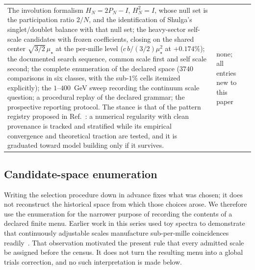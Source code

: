 \documentclass[aps,twocolumn,superscriptaddress,nofootinbib,floatfix]{revtex4-2}
\newcommand{\mstar}{\mu_\star}
\begin{document}
\begin{table}[t]
\begin{ruledtabular}
\begin{tabular}{p{}p{}p{}}
The involution formalism $H_N=2P_N-I$, $H_N^2=I$, whose null set is the participation ratio $2/N$, and the identification of Shulga's singlet/doublet balance with that null set; the heavy-sector self-scale candidates with frozen coefficients, closing on the shared center $\sqrt{3/2}\,\mstar$ at the per-mille level ($c\,b/(3/2)\mstar^2$ at $+0.174\%$); the documented search sequence, common scale first and self scale second; the complete enumeration of the declared space ($3740$ comparisons in six classes, with the sub-$1\%$ cells itemized explicitly); the $1$--$400$~GeV sweep recording the continuum scale question; a procedural replay of the declared grammar; the prospective reporting protocol. The stance is that of the pattern registry proposed in Ref.~\cite{BrilliantPattern}: a numerical regularity with clean provenance is tracked and stratified while its empirical convergence and theoretical traction are tested, and it is graduated toward model building only if it survives. &
none; all entries new to this paper \\
\end{tabular}
\end{ruledtabular}
\end{table}

\subsection{Candidate-space enumeration}
\label{sec:enum}

Writing the selection procedure down in advance fixes what was chosen; it does not reconstruct the historical space from which those choices arose. We therefore use the enumeration for the narrower purpose of recording the contents of a declared finite menu. Earlier work in this series used toy spectra to demonstrate that continuously adjustable scales manufacture sub-per-mille coincidences readily~\cite{BrilliantAPPB}. That observation motivated the present rule that every admitted scale be assigned before the census. It does not turn the resulting menu into a global trials correction, and no such interpretation is made below.
\end{document}
